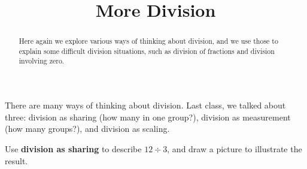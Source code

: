 \documentclass{ximera}
\title{More Division}
\begin{document}
\begin{abstract}
Here again we explore various ways of thinking about division, and we use those to explain some difficult division situations, such as division of fractions and division involving zero.
\end{abstract}
\maketitle


%
%
%

There are many ways of thinking about division.  Last class, we talked about three:  division as sharing (how many in one group?), division as measurement (how many groups?), and division as scaling.  

\begin{problem}
Use \textbf{division as sharing} to describe $12\div 3$, and draw a picture to illustrate the result.  
\begin{freeResponse}
\end{freeResponse}
\end{problem}
\end{document}
